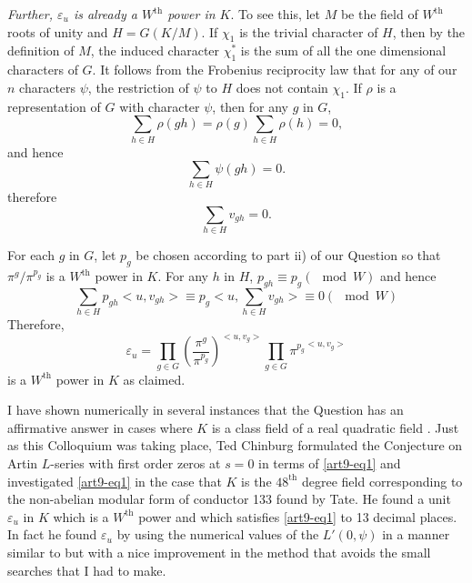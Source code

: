 \textit{Further, $\varepsilon_u$ is already a $W^{\text{th}}$ power in $K$}. To see this, let $M$ be the field of $W^{\text{th}}$ roots of unity and $H = G(K/M)$. If $\chi_1$ is the trivial character of $H$, then by the definition of $M$, the induced character $\chi^\ast_1$ is the sum of all the one dimensional characters of $G$. It follows from the Frobenius reciprocity law that for any of our $n$ characters $\psi$, the restriction of $\psi$ to $H$ does not contain $\chi_1$. If $\rho$ is a representation of $G$ with character $\psi$, then for any $g$ in $G$,
$$
\sum\limits_{h \in H} \rho (gh) =\rho (g) \sum\limits_{h \in H} \rho (h) = 0,
$$
and hence 
$$
\sum\limits_{h \in H} \psi (gh ) = 0.
$$
therefore 
$$
\sum\limits_{h \in H} v_{gh} = 0.
$$

For each $g$ in $G$, let $p_g$ be chosen according to part ii) of our Question so that $\pi^g/\pi^{p_g}$ is a $W^{\text{th}}$ power in $K$. For any $h$ in $H$, $p_{gh} \equiv p_g (\mod W)$ and hence 
$$
\sum\limits_{h \in H} p_{gh} < u, v_{gh}> \equiv p_g < u, \sum\limits_{h \in H} v_{gh} > \equiv 0 (\mod W)
$$
Therefore, 
$$
\varepsilon_u = \prod\limits_{g \in G} \left(\frac{\pi^g}{\pi^{p_g}} \right)^{<u, v_g>} \prod\limits_{g \in G} {\pi^{p_g}}^{<u, v_g>}
$$
is a $W^{\text{th}}$ power in $K$ as claimed.

I have shown numerically in several instances that the Question has an affirmative answer in cases where $K$ is a class field of a real quadratic field \cite[III, IV]{art9-6}. Just as this Colloquium was taking place, Ted Chinburg \cite{art9-1} formulated the Conjecture on Artin $L$-series with first order zeros at $s =0$ in terms of \eqref{art9-eq1} and  investigated \eqref{art9-eq1} in the case that $K$ is the $48^{\text{th}}$ degree field corresponding to the non-abelian modular form of conductor 133 found by Tate. He found a unit $\varepsilon_u$ in $K$ which is a $W^{\text{th}}$ power and which satisfies \eqref{art9-eq1} to 13 decimal places. In fact he found $\varepsilon_u$ by using the numerical values  of the $L' (0, \psi)$ in a manner similar to \cite[II]{art9-6} but with a nice improvement in the method that avoids the small searches that I had to make.

